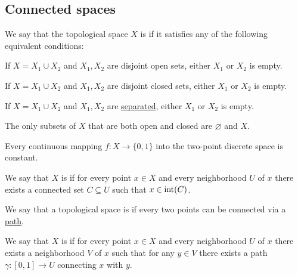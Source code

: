 \subsection{Connected spaces}\label{subsec:connected_spaces}

\begin{definition}\label{def:connected_space}
  We say that the topological space \( X \) is  if it satisfies any of the following equivalent conditions:
  \begin{thmenum}
     If \( X = X_1 \cup X_2 \) and \( X_1, X_2 \) are disjoint open sets, either \( X_1 \) or \( X_2 \) is empty.

     If \( X = X_1 \cup X_2 \) and \( X_1, X_2 \) are disjoint closed sets, either \( X_1 \) or \( X_2 \) is empty.

     If \( X = X_1 \cup X_2 \) and \( X_1, X_2 \) are \hyperref[def:topological_space_separation]{separated}, either \( X_1 \) or \( X_2 \) is empty.

     The only subsets of \( X \) that are both open and closed are \( \varnothing \) and \( X \).

     Every continuous mapping \( f: X \to \{ 0, 1 \} \) into the two-point discrete space is constant.
  \end{thmenum}
\end{definition}

\begin{definition}\label{def:locally_connected_space}
  We say that \( X \) is  if for every point \( x \in X \) and every neighborhood \( U \) of \( x \) there exists a connected set \( C \subseteq U \) such that \( x \in \operatorname{int}(C) \).
\end{definition}

\begin{definition}\label{def:path_connected_space}
  We say that a topological space is  if every two points can be connected via a \hyperref[def:parametric_curve]{path}.
\end{definition}

\medskip

\begin{definition}\label{def:locally_path_connected_space}
  We say that \( X \) is  if for every point \( x \in X \) and every neighborhood \( U \) of \( x \) there exists a neighborhood \( V \) of \( x \) such that for any \( y \in V \) there exists a path \( \gamma: [0, 1] \to U \) connecting \( x \) with \( y \).
\end{definition}

